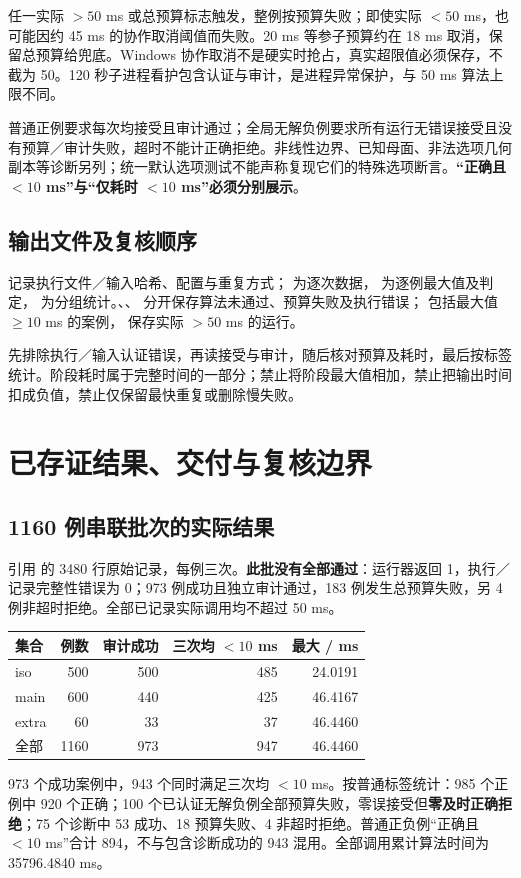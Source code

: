 \documentclass[UTF8,zihao=5,fontset=windows,a4paper]{ctexart}
\begin{document}
任一实际 $>50$ ms 或总预算标志触发，整例按预算失败；即使实际 $<50$ ms，也可能因约 45 ms 的协作取消阈值而失败。20 ms 等参子预算约在 18 ms 取消，保留总预算给兜底。Windows 协作取消不是硬实时抢占，真实超限值必须保存，不截为 50。120 秒子进程看护包含认证与审计，是进程异常保护，与 50 ms 算法上限不同。

普通正例要求每次均接受且审计通过；全局无解负例要求所有运行无错误接受且没有预算／审计失败，超时不能计正确拒绝。非线性边界、已知母面、非法选项几何副本等诊断另列；统一默认选项测试不能声称复现它们的特殊选项断言。\textbf{“正确且 $<10$ ms”与“仅耗时 $<10$ ms”必须分别展示}。

\subsection{输出文件及复核顺序}
 记录执行文件／输入哈希、配置与重复方式； 为逐次数据， 为逐例最大值及判定， 为分组统计。、、 分开保存算法未通过、预算失败及执行错误； 包括最大值 $\ge10$ ms 的案例， 保存实际 $>50$ ms 的运行。

先排除执行／输入认证错误，再读接受与审计，随后核对预算及耗时，最后按标签统计。阶段耗时属于完整时间的一部分；禁止将阶段最大值相加，禁止把输出时间扣成负值，禁止仅保留最快重复或删除慢失败。

\newpage
\section{已存证结果、交付与复核边界}
\subsection{1160 例串联批次的实际结果}
引用  的 3480 行原始记录，每例三次。\textbf{此批没有全部通过}：运行器返回 1，执行／记录完整性错误为 0；973 例成功且独立审计通过，183 例发生总预算失败，另 4 例非超时拒绝。全部已记录实际调用均不超过 50 ms。
\begin{center}\small\renewcommand{\arraystretch}{1.2}
\begin{tabularx}{\linewidth}{@{}Yrrrr@{}}\toprule
集合 & 例数 & 审计成功 & 三次均 $<10$ ms & 最大 / ms\\\midrule
iso & 500 & 500 & 485 & 24.0191\\
main & 600 & 440 & 425 & 46.4167\\
extra & 60 & 33 & 37 & 46.4460\\\midrule
全部 & 1160 & 973 & 947 & 46.4460\\\bottomrule
\end{tabularx}
\end{center}
973 个成功案例中，943 个同时满足三次均 $<10$ ms。按普通标签统计：985 个正例中 920 个正确；100 个已认证无解负例全部预算失败，零误接受但\textbf{零及时正确拒绝}；75 个诊断中 53 成功、18 预算失败、4 非超时拒绝。普通正负例“正确且 $<10$ ms”合计 894，不与包含诊断成功的 943 混用。全部调用累计算法时间为 35796.4840 ms。
\end{document}
